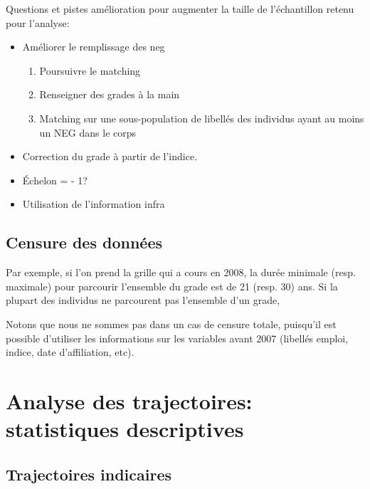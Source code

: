 \documentclass[11pt,a4paper]{article}
\begin{document}
Questions et pistes amélioration pour augmenter la taille de l'échantillon retenu pour l'analyse: 
\begin{itemize}[leftmargin=1cm ,parsep=0cm,itemsep=0cm,topsep=0cm] 
\item Améliorer le remplissage des neg 
	\begin{enumerate}[leftmargin=1cm ,parsep=0cm,itemsep=0cm,topsep=0cm] 
	\item Poursuivre le matching
	\item Renseigner des grades à la main 
	\item Matching sur une sous-population de libellés des individus ayant au moins un NEG dans le corps
	\end{enumerate}
\item Correction du grade à partir de l'indice. 
\item Échelon = - 1?
\item Utilisation de l'information infra
\end{itemize}




\subsection{Censure des données}

Par exemple, si l'on prend la grille qui a cours en 2008, la durée minimale (resp. maximale) pour parcourir l'ensemble du grade est de 21 (resp. 30) ans. Si la plupart des individus ne parcourent pas l'ensemble d'un grade, 

Notons que nous ne sommes pas dans un cas de censure totale, puisqu'il est possible d'utiliser les informations sur les variables avant 2007 (libellés emploi, indice, date d'affiliation, etc). 




\clearpage
\section{Analyse des trajectoires: statistiques descriptives}


\subsection{Trajectoires indicaires}
\end{document}
